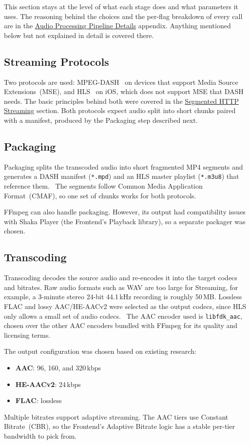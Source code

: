 This section stays at the level of what each stage does and what
parameters it uses. The reasoning behind the choices and the per-flag
breakdown of every call are in the \hyperref[app:audio_details]{Audio
Processing Pipeline Details} appendix. Anything mentioned below but
not explained in detail is covered there.

\subsection{Streaming Protocols}
Two protocols are used: MPEG-DASH~\parencite{dash} on devices that
support Media Source Extensions~(MSE), and HLS~\parencite{hls} on iOS,
which does not support MSE that DASH needs. The basic principles
behind both were covered in the \hyperref[it:streaming]{Segmented HTTP
Streaming} section. Both protocols expect audio split into short
chunks paired with a manifest, produced by the Packaging step
described next.

\subsection{Packaging}
Packaging splits the transcoded audio into short fragmented MP4 segments
and generates a DASH manifest (\texttt{*.mpd}) and an HLS master
playlist (\texttt{*.m3u8}) that reference them.~\parencite{packaging_def}
The segments follow Common Media Application Format~(CMAF), so one set
of chunks works for both protocols.

FFmpeg can also handle packaging. However, its output had
compatibility issues with Shaka Player (the
Frontend's Playback library), so a separate packager was chosen.

\subsection{Transcoding}
Transcoding decodes the source audio and re-encodes it into the target
codecs and bitrates. Raw audio formats such as WAV are too large for
Streaming, for example, a 3-minute stereo 24-bit 44.1\,kHz recording is
roughly 50\,MB\@. Lossless FLAC and lossy AAC/HE-AACv2 were selected as
the output codecs, since HLS only allows a small set of audio
codecs.~\parencite{apple_hls_specs_audio} The AAC encoder used is
\texttt{libfdk\_aac}, chosen over the other AAC encoders bundled with
FFmpeg for its quality and licensing terms.

The output configuration was chosen based on existing research:~\parencite{codec_evaluation_1, codec_evaluation_2,
    codec_evaluation_3, spotify_codecs, apple_hls_specs_audio, mdn_aac}
\begin{itemize}
    \item \textbf{AAC}: 96, 160, and 320\,kbps
    \item \textbf{HE-AACv2}: 24\,kbps
    \item \textbf{FLAC}: lossless
\end{itemize}
Multiple bitrates support adaptive streaming. The AAC tiers use
Constant Bitrate~(CBR), so the Frontend's Adaptive Bitrate logic has a
stable per-tier bandwidth to pick from.

